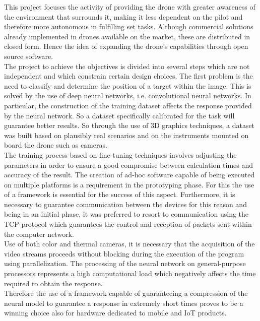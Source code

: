 \noindent This project focuses the activity of providing the drone with greater 
awareness of the environment that surrounds it, making it less dependent on the 
pilot and therefore more autonomous in fulfilling set tasks.
Although commercial solutions already implemented in drones available on the 
market, these are distributed in closed form.
Hence the idea of expanding the drone's capabilities through open source 
software.\\
The project to achieve the objectives is divided into several steps which are 
not independent and which constrain certain design choices.
The first problem is the need to classify and determine the position of a target
within the image. This is solved by the use of deep neural networks,
i.e. convolutional neural networks.
In particular, the construction of the training dataset affects the response 
provided by the neural network. 
So a dataset specifically calibrated for the task will guarantee better results.
So through the use of 3D graphics techniques, a dataset was built based on
plausibly real scenarios and on the instruments mounted on board the drone such
as cameras.\\
The training process based on fine-tuning techniques involves adjusting the
parameters in order to ensure a good compromise between calculation times and
accuracy of the result.
The creation of ad-hoc software capable of being executed on multiple platforms
is a requirement in the prototyping phase. For this the use of a framework is
essential for the success of this aspect.
Furthermore, it is necessary to guarantee communication between the devices for
this reason and being in an initial phase, it was preferred to resort to
communication using the TCP protocol which guarantees the control and reception
of packets sent within the computer network.\\ 
Use of both color and thermal cameras, it is necessary that the acquisition of 
the video streams proceeds without blocking during the execution of the program 
using parallelization.
The processing of the neural network on general-purpose processors represents a
high computational load which negatively affects the time required to obtain the
response.\\
Therefore the use of a framework capable of guaranteeing a compression of the
neural model to guarantee a response in extremely short times proves to be a
winning choice also for hardware dedicated to mobile and IoT products.\\


